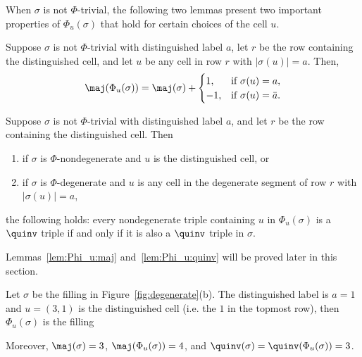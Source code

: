 When $\sigma$ is not $\Phi$-trivial, the following two lemmas present two important properties of $\Phi_u(\sigma)$ that hold for certain choices of the cell $u$.

\begin{lemma}\label{lem:Phi_u:maj}
Suppose $\sigma$ is not $\Phi$-trivial with distinguished label $a$, let $r$ be the row containing the distinguished cell, and let $u$ be any cell in row $r$ with $|\sigma(u)|=a$. 
Then, 
\begin{equation}
\maj(\Phi_u(\sigma))=\maj(\sigma)+\begin{cases}1,&\mbox{if}\ \sigma(u)=a,\\-1,&\mbox{if}\ \sigma(u)=\bar{a}.\end{cases}\end{equation}
\end{lemma}

\begin{lemma}\label{lem:Phi_u:quinv}
Suppose $\sigma$ is not $\Phi$-trivial with distinguished label $a$, and let $r$ be the row containing the distinguished cell. Then
\begin{enumerate}
\item if $\sigma$ is $\Phi$-nondegenerate and $u$ is the distinguished cell, or
\item if $\sigma$ is $\Phi$-degenerate and $u$ is any cell in the degenerate segment of row $r$ with $|\sigma(u)|=a$, 
\end{enumerate}
the following holds: every nondegenerate triple containing $u$ in $\Phi_u(\sigma)$  is a $\quinv$ triple if and only if it is also a $\quinv$ triple in $\sigma$.
\end{lemma}

Lemmas~\ref{lem:Phi_u:maj} and~\ref{lem:Phi_u:quinv} will be proved later in this section.

\begin{example}
Let $\sigma$ be the filling in Figure~\ref{fig:degenerate}(b). The distinguished label is $a=1$ and $u=(3,1)$ is the distinguished cell (i.e. the $1$ in the topmost row), then $\Phi_u(\sigma)$ is the filling

\begin{center}
\end{center}
Moreover, $\maj(\sigma)=3$, $\maj(\Phi_u(\sigma))=4$, and $\quinv(\sigma)=\quinv(\Phi_u(\sigma))=3$.
\end{example}


